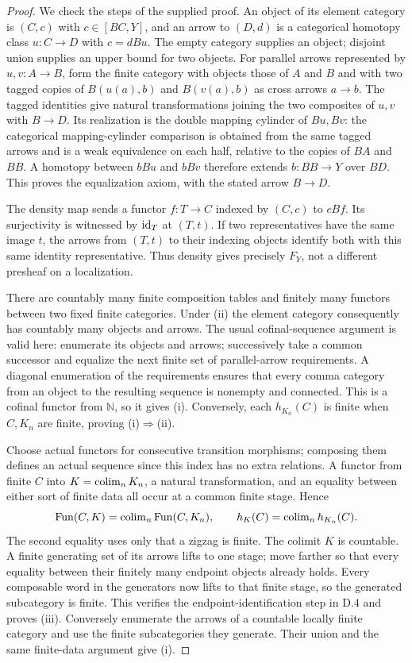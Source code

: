 \begin{proof}
We check the steps of the supplied proof.  An object of its element
category is $(C,c)$ with $c\in[BC,Y]$, and an arrow to $(D,d)$ is a
categorical homotopy class $u:C\to D$ with $c=dBu$.
The empty category supplies an object; disjoint union supplies an upper
bound for two objects.  For parallel arrows represented by $u,v:A\to B$,
form the finite category with objects those of $A$ and $B$ and with two
tagged copies of $B(u(a),b)$ and $B(v(a),b)$ as cross arrows $a\to b$.
The tagged identities give natural transformations joining the two
composites of $u,v$ with $B\to D$.  Its realization is the double mapping
cylinder of $Bu,Bv$: the categorical mapping-cylinder comparison is
obtained from the same tagged arrows and is a weak equivalence on each
half, relative to the copies of $BA$ and $BB$.  A homotopy between
$bBu$ and $bBv$ therefore extends $b:BB\to Y$ over $BD$.
This proves the equalization axiom, with the stated arrow $B\to D$.

The density map sends a functor $f:T\to C$ indexed by $(C,c)$ to
$cBf$.  Its surjectivity is witnessed by $\mathrm{id}_T$ at $(T,t)$.
If two representatives have the same image $t$, the arrows from
$(T,t)$ to their indexing objects identify both with this same identity
representative.  Thus density gives precisely $F_Y$, not a different
presheaf on a localization.

There are countably many finite composition tables and finitely many
functors between two fixed finite categories.  Under (ii) the element
category consequently has countably many objects and arrows.  The usual
cofinal-sequence argument is valid here: enumerate its objects and
arrows; successively take a common successor and equalize the next
finite set of parallel-arrow requirements.  A diagonal enumeration of
the requirements ensures that every comma category from an object to
the resulting sequence is nonempty and connected.  This is a cofinal
functor from $\mathbb N$, so it gives (i).  Conversely, each $h_{K_n}(C)$
is finite when $C,K_n$ are finite, proving (i)$\Rightarrow$(ii).

Choose actual functors for consecutive transition morphisms; composing
them defines an actual sequence since this index has no extra relations.
A functor from finite $C$ into $K=\operatorname{colim}_nK_n$, a natural transformation,
and an equality between either sort of finite data all occur at a common
finite stage.  Hence
\[
 \operatorname{Fun}(C,K)=\operatorname{colim}_n\operatorname{Fun}(C,K_n),\qquad
 h_K(C)=\operatorname{colim}_n h_{K_n}(C).
\]
The second equality uses only that a zigzag is finite.  The colimit $K$
is countable.  A finite generating set of its arrows lifts to one stage;
move farther so that every equality between their finitely many endpoint
objects already holds.  Every composable word in the generators now
lifts to that finite stage, so the generated subcategory is finite.
This verifies the endpoint-identification step in D.4 and proves (iii).
Conversely enumerate the arrows of a countable locally finite category
and use the finite subcategories they generate.  Their union and the
same finite-data argument give (i).
\end{proof}

